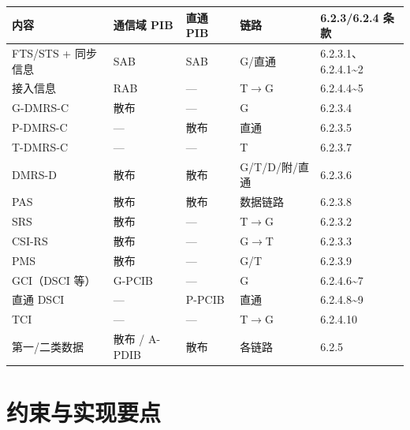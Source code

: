 \documentclass[11pt,a4paper]{ctexart}
\begin{document}
\begin{table}[h]
\centering
\footnotesize
\begin{tabular}{L{3.2cm}L{2cm}L{2.2cm}L{2.2cm}L{4.5cm}}
\toprule
\textbf{内容} & \textbf{通信域 PIB} & \textbf{直通 PIB} & \textbf{链路} & \textbf{6.2.3/6.2.4 条款} \\
\midrule
FTS/STS + 同步信息 & SAB & SAB & G/直通 & 6.2.3.1、6.2.4.1\textasciitilde 2 \\
接入信息 & RAB & --- & T$\rightarrow$G & 6.2.4.4\textasciitilde 5 \\
G-DMRS-C & 散布 & --- & G & 6.2.3.4 \\
P-DMRS-C & --- & 散布 & 直通 & 6.2.3.5 \\
T-DMRS-C & --- & --- & T & 6.2.3.7 \\
DMRS-D & 散布 & 散布 & G/T/D/附/直通 & 6.2.3.6 \\
PAS & 散布 & 散布 & 数据链路 & 6.2.3.8 \\
SRS & 散布 & --- & T$\rightarrow$G & 6.2.3.2 \\
CSI-RS & 散布 & --- & G$\rightarrow$T & 6.2.3.3 \\
PMS & 散布 & --- & G/T & 6.2.3.9 \\
GCI（DSCI 等） & G-PCIB & --- & G & 6.2.4.6\textasciitilde 7 \\
直通 DSCI & --- & P-PCIB & 直通 & 6.2.4.8\textasciitilde 9 \\
TCI & --- & --- & T$\rightarrow$G & 6.2.4.10 \\
第一/二类数据 & 散布 / A-PDIB & 散布 & 各链路 & 6.2.5 \\
\bottomrule
\end{tabular}
\end{table}

\section{约束与实现要点}
\end{document}
